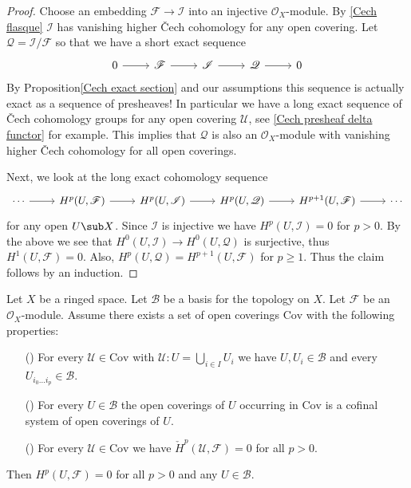 \begin{proof}
Choose an embedding $\mathscr{F}\to\mathscr{I}$ into an injective $\mathscr{O}_X$-module. By \cref{Cech flasque} $\mathscr{I}$ has vanishing higher \v{C}ech cohomology for any open covering. Let $\mathscr{Q}=\mathscr{I}/\mathscr{F}$ so that we have a short exact sequence
\[\begin{tikzcd}
0\ar[r]&\mathscr{F}\ar[r]&\mathscr{I}\ar[r]&\mathscr{Q}\ar[r]&0
\end{tikzcd}\]
By Proposition\ref{Cech exact section} and our assumptions this sequence is actually exact as a sequence of presheaves! In particular we have a long exact sequence of \v{C}ech cohomology groups for any open covering $\mathcal{U}$, see \cref{Cech presheaf delta functor} for example. This implies that $\mathscr{Q}$ is also an $\mathscr{O}_X$-module with vanishing higher \v{C}ech cohomology for all open coverings.\par
Next, we look at the long exact cohomology sequence
\[\begin{tikzcd}
\cdots\ar[r]&H^p(U,\mathscr{F})\ar[r]&H^p(U,\mathscr{I})\ar[r]&H^p(U,\mathscr{Q})\ar[r]&H^{p+1}(U,\mathscr{F})\ar[r]&\cdots
\end{tikzcd}\]
for any open $U\sub X$. Since $\mathscr{I}$ is injective we have $H^p(U,\mathscr{I})=0$ for $p>0$. By the above we see that $H^0(U,\mathscr{I})\to H^0(U,\mathscr{Q})$ is surjective, thus $H^1(U,\mathscr{F})=0$. Also, $H^p(U,\mathscr{Q})=H^{p+1}(U,\mathscr{F})$ for $p\geq 1$. Thus the claim follows by an induction.
\end{proof}
\begin{proposition}
Let $X$ be a ringed space. Let $\mathcal{B}$ be a basis for the topology on $X$. Let $\mathscr{F}$ be an $\mathscr{O}_X$-module. Assume there exists a set of open coverings $\mathrm{Cov}$ with the following properties:
\begin{itemize}
\item[(\rmnum{1})] For every $\mathcal{U}\in\mathrm{Cov}$ with $\mathcal{U}:U=\bigcup_{i\in I}U_i$ we have $U,U_i\in\mathcal{B}$ and every $U_{i_0\dots i_p}\in\mathcal{B}$.
\item[(\rmnum{2})] For every $U\in\mathcal{B}$ the open coverings of $U$ occurring in $\mathrm{Cov}$ is a cofinal system of open coverings of $U$.
\item[(\rmnum{3})] For every $\mathcal{U}\in\mathrm{Cov}$ we have $\check{H}^p(\mathcal{U},\mathscr{F})=0$ for all $p>0$.
\end{itemize}
Then $H^p(U,\mathscr{F})=0$ for all $p>0$ and any $U\in\mathcal{B}$.
\end{proposition}
